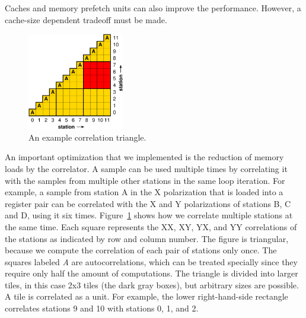 \documentclass{article}
\begin{document}
Caches and memory prefetch units can also improve the performance.
However, a cache-size dependent tradeoff must be made.




\begin{figure}[t]
\begin{center}
\includegraphics[width=4.2cm]{figures/correlation-triangle.pdf}
\end{center}
\vspace{-0.5cm}
\caption{An example correlation triangle.}
\label{fig-correlation}
\end{figure}

An important optimization that we implemented is the reduction
of memory loads by the correlator. 
A sample can be used multiple times by correlating it
with the samples from multiple other stations in the same loop iteration.
For example, a sample from station A in the X polarization
that is loaded into a register pair can be correlated with the X and
Y polarizations of stations B, C and D, using it six times. 
Figure~\ref{fig-correlation} shows how we correlate multiple
stations at the same time. Each square represents the XX, XY,
YX, and YY correlations of the stations as indicated by row and
column number. The figure is triangular, because we compute
the correlation of each pair of stations only once. The squares labeled \emph{A} are
autocorrelations, which can be treated specially since they require only half
the amount of computations.
The triangle is divided into larger tiles, in this case 
2x3 tiles (the dark gray boxes), but arbitrary sizes are possible.
A tile is correlated as a unit. For example, the lower
right-hand-side rectangle correlates stations 9 and 10 with stations
0, 1, and 2.
\end{document}
